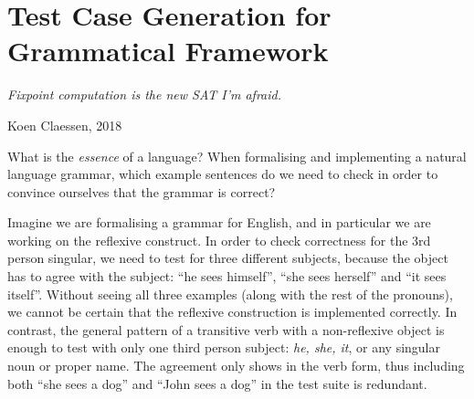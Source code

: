 \def\t#1{\texttt{#1}}
\def\gf{\textsc{gf}}
\def\pgf{\textsc{pgf}}
\def\lfg{\textsc{lfg}}
\def\ccg{\textsc{ccg}}
\def\tag{\textsc{tag}}
\def\cfg{\textsc{cfg}}
\def\pmcfg{\textsc{pmcfg}}
\def\hpsg{\textsc{hpsg}}
\def\feat{\textsc{feat}}
\def\numOfLex{17}
\def\numOfFun{8}
\def\gray#1{{\color{gray}\char`<#1\char`>}}
\newcommand{\tts}[1]{{\tt #1}}

\chapter{Test Case Generation for Grammatical Framework}
\label{chapterGFtest}

\epigraph{\it Fixpoint computation is the new SAT I'm afraid.}{Koen
  Claessen, 2018}

\noindent What is the \emph{essence} of a language? When formalising
and implementing a natural language grammar, which example sentences
do we need to check in order to convince ourselves that the grammar is
correct? 

Imagine we are formalising a grammar for English, and in particular we
are working on the reflexive construct. In order to check correctness
for the 3rd person singular, we need to test for three different
subjects, because the object has to agree with the subject: ``he sees
himself'', ``she sees herself'' and ``it sees itself''. Without seeing
all three examples (along with the rest of the pronouns), we cannot be certain that the reflexive
construction is implemented correctly. In contrast, the general
pattern of a transitive verb with a non-reflexive object is enough to
test with only one third person subject: \emph{he, she, it}, or any
singular noun or proper name. The agreement only shows in the verb
form, thus including both ``she sees a dog'' and ``John sees a dog''
in the test suite is redundant.  

